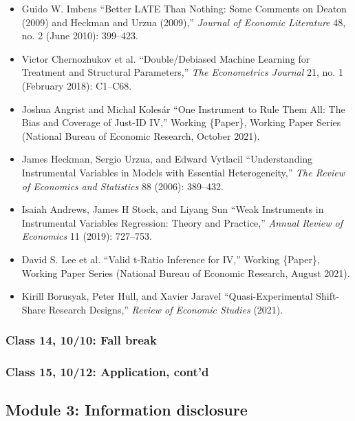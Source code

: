 \documentclass[11pt,]{article}
\providecommand{\tightlist}{%
  \setlength{\itemsep}{0pt}\setlength{\parskip}{0pt}}
\begin{document}
\begin{itemize}
\tightlist
\item
  Guido W. Imbens {``Better {LATE} {Than} {Nothing}: {Some} {Comments}
  on {Deaton} (2009) and {Heckman} and {Urzua} (2009),''} \emph{Journal
  of Economic Literature} 48, no. 2 (June 2010): 399--423.
\item
  Victor Chernozhukov et al. {``Double/Debiased Machine Learning for
  Treatment and Structural Parameters,''} \emph{The Econometrics
  Journal} 21, no. 1 (February 2018): C1--C68.
\item
  Joshua Angrist and Michal Kolesár {``One {Instrument} to {Rule} {Them}
  {All}: {The} {Bias} and {Coverage} of {Just}-{ID} {IV},''} Working
  \{Paper\}, Working {Paper} {Series} (National Bureau of Economic
  Research, October 2021).
\item
  James Heckman, Sergio Urzua, and Edward Vytlacil {``Understanding
  {Instrumental} {Variables} in {Models} with {Essential}
  {Heterogeneity},''} \emph{The Review of Economics and Statistics} 88
  (2006): 389--432.
\item
  Isaiah Andrews, James H Stock, and Liyang Sun {``Weak Instruments in
  Instrumental Variables Regression: {Theory} and Practice,''}
  \emph{Annual Review of Economics} 11 (2019): 727--753.
\item
  David S. Lee et al. {``Valid t-Ratio {Inference} for {IV},''} Working
  \{Paper\}, Working {Paper} {Series} (National Bureau of Economic
  Research, August 2021).
\item
  Kirill Borusyak, Peter Hull, and Xavier Jaravel
  {``Quasi-{Experimental} {Shift}-{Share} {Research} {Designs},''}
  \emph{Review of Economic Studies} (2021).
\end{itemize}

\hypertarget{class-14-1010-fall-break}{%
\subsubsection{Class 14, 10/10: Fall
break}\label{class-14-1010-fall-break}}

\hypertarget{class-15-1012-application-contd}{%
\subsubsection{Class 15, 10/12: Application,
cont'd}\label{class-15-1012-application-contd}}

\hypertarget{module-3-information-disclosure}{%
\subsection{Module 3: Information
disclosure}\label{module-3-information-disclosure}}
\end{document}
